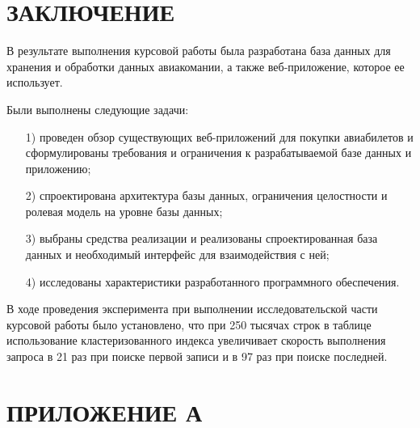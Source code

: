 \documentclass{bmstu}
\begin{document}
{\centering \chapter*{ЗАКЛЮЧЕНИЕ}}

В результате выполнения курсовой работы была разработана база данных для хранения и обработки данных авиакомании, а также веб-приложение, которое ее использует.

Были выполнены следующие задачи:

\begin{enumerate}
\item[1)] проведен обзор существующих веб-приложений для покупки авиабилетов и сформулированы требования и ограничения к разрабатываемой базе данных и приложению;
\item[2)] спроектирована архитектура базы данных, ограничения целостности и ролевая модель на уровне базы данных;
\item[3)] выбраны средства реализации и реализованы спроектированная база данных и необходимый интерфейс для взаимодействия с ней;
\item[4)] исследованы характеристики разработанного программного обеспечения.
\end{enumerate}

В ходе проведения эксперимента при выполнении исследовательской части курсовой работы было установлено, что при 250 тысячах строк в таблице использование кластеризованного индекса увеличивает скорость выполнения запроса в 21 раз при поиске первой записи и в 97 раз при поиске последней.

{\centering \printbibliography[title=СПИСОК ИСПОЛЬЗОВАННЫХ ИСТОЧНИКОВ]}

{\centering \chapter*{ПРИЛОЖЕНИЕ А}}
\end{document}
